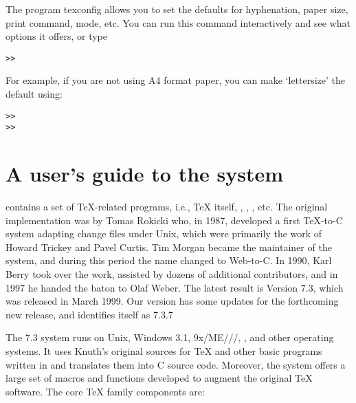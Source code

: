 \documentclass{article}
\begin{document}
The program \textsf{texconfig} allows you to set the defaults for
hyphenation, paper size, print command, \MF{} mode, etc. You can
run this command interactively and see what options it offers, or type
\begin{alltt}
>> 
\end{alltt}

For example, if you are not using A4 format paper, you can make
`lettersize' the default using:
\begin{alltt}
>> 
>> 
\end{alltt}

\section{A user's guide to the \protect\Webc{} system}


\Webc{} contains a set of \TeX-related programs, i.e., \TeX{} itself,
\MF{}, \MP, \BibTeX{}, etc.  The original implementation was by Tomas
Rokicki who, in 1987, developed a first \TeX{}-to-C system adapting
change files under Unix, which were primarily the work of Howard
Trickey and Pavel Curtis.  Tim Morgan became the maintainer of the
system, and during this period the name changed to Web-to-C\@.  In
1990, Karl Berry took over the work, assisted by dozens of additional
contributors, and in 1997 he handed the baton to Olaf Weber.  The
latest result is \Webc{} Version 7.3, which was released in March
1999. Our version has some updates for the forthcoming new release,
and identifies itself as 7.3.7

The \Webc{} 7.3 system runs on Unix, Windows 3.1, 9x/ME///,
, and other operating systems. It uses Knuth's
original sources for \TeX{} and other basic programs written in \web{}
and translates them into C source code. Moreover, the system offers a
large set of macros and functions developed to augment the original
\TeX{} software. The core \TeX{} family components are:
\end{document}
